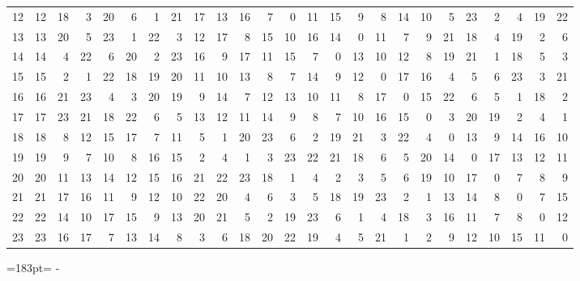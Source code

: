 \documentclass[10pt,a4paper]{article}
\newcommand{\needspace}[1]{\par\penalty-100\begingroup\dimen0=#1\relax\dimen2=\pagegoal
  \advance\dimen2-\pagetotal\ifdim\dimen0>\dimen2\relax\ifdim\dimen2>0pt\vfil\break\fi\fi
  \endgroup}
\numberwithin{equation}{section}
\begin{document}
{\begin{longtable}{@{}r|rrrrrrrrrrrrrrrrrrrrrrrr@{}}
12 & 12 & 18 & 3 & 20 & 6 & 1 & 21 & 17 & 13 & 16 & 7 & 0 & 11 & 15 & 9 & 8 & 14 & 10 & 5 & 23 & 2 & 4 & 19 & 22\\
13 & 13 & 20 & 5 & 23 & 1 & 22 & 3 & 12 & 17 & 8 & 15 & 10 & 16 & 14 & 0 & 11 & 7 & 9 & 21 & 18 & 4 & 19 & 2 & 6\\
14 & 14 & 4 & 22 & 6 & 20 & 2 & 23 & 16 & 9 & 17 & 11 & 15 & 7 & 0 & 13 & 10 & 12 & 8 & 19 & 21 & 1 & 18 & 5 & 3\\
15 & 15 & 2 & 1 & 22 & 18 & 19 & 20 & 11 & 10 & 13 & 8 & 7 & 14 & 9 & 12 & 0 & 17 & 16 & 4 & 5 & 6 & 23 & 3 & 21\\
16 & 16 & 21 & 23 & 4 & 3 & 20 & 19 & 9 & 14 & 7 & 12 & 13 & 10 & 11 & 8 & 17 & 0 & 15 & 22 & 6 & 5 & 1 & 18 & 2\\
17 & 17 & 23 & 21 & 18 & 22 & 6 & 5 & 13 & 12 & 11 & 14 & 9 & 8 & 7 & 10 & 16 & 15 & 0 & 3 & 20 & 19 & 2 & 4 & 1\\
18 & 18 & 8 & 12 & 15 & 17 & 7 & 11 & 5 & 1 & 20 & 23 & 6 & 2 & 19 & 21 & 3 & 22 & 4 & 0 & 13 & 9 & 14 & 16 & 10\\
19 & 19 & 9 & 7 & 10 & 8 & 16 & 15 & 2 & 4 & 1 & 3 & 23 & 22 & 21 & 18 & 6 & 5 & 20 & 14 & 0 & 17 & 13 & 12 & 11\\
20 & 20 & 11 & 13 & 14 & 12 & 15 & 16 & 21 & 22 & 23 & 18 & 1 & 4 & 2 & 3 & 5 & 6 & 19 & 10 & 17 & 0 & 7 & 8 & 9\\
21 & 21 & 17 & 16 & 11 & 9 & 12 & 10 & 22 & 20 & 4 & 6 & 3 & 5 & 18 & 19 & 23 & 2 & 1 & 13 & 14 & 8 & 0 & 7 & 15\\
22 & 22 & 14 & 10 & 17 & 15 & 9 & 13 & 20 & 21 & 5 & 2 & 19 & 23 & 6 & 1 & 4 & 18 & 3 & 16 & 11 & 7 & 8 & 0 & 12\\*
23 & 23 & 16 & 17 & 7 & 13 & 14 & 8 & 3 & 6 & 18 & 20 & 22 & 19 & 4 & 5 & 21 & 1 & 2 & 9 & 12 & 10 & 15 & 11 & 0\\
\bottomrule\end{longtable}}
\needspace{183pt}
\end{document}
